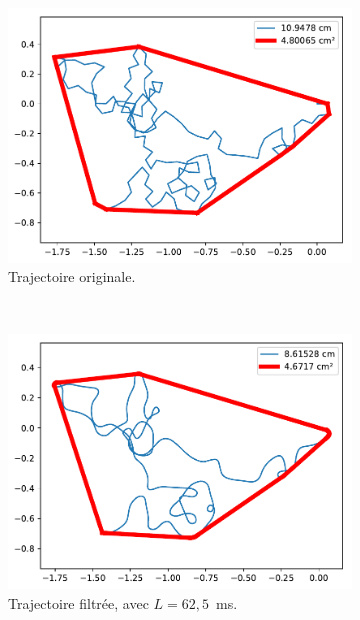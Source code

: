 	\begin{figure}[!htb]
		\begin{subfigure}[t]{0.49\textwidth}
			\centering
			\includegraphics[width=\textwidth]{figures/ch5/2_19_MovingAverage_2_19_120_32}
			\caption{Trajectoire originale.}
			\label{fig:movAvOriginal}
		\end{subfigure}
		~
		\begin{subfigure}[t]{0.49\textwidth}
			\centering
			\includegraphics[width=\textwidth]{figures/ch5/2_19_MovingAverage_2_19_120_32_window_62_5}
			\caption{Trajectoire filtrée, avec $L = 62,5$~ms.}
			\label{fig:movAv0625}
		\end{subfigure}
		~
		\begin{subfigure}[t]{0.49\textwidth}

\end{subfigure}
\end{figure}
